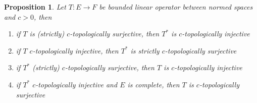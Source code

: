 \documentclass[12pt]{article}
\newtheorem{proposition}[theorem]{Proposition}
\begin{document}
\begin{proposition}\label{PrDualOps} Let $ T:E\to F$ be bounded linear operator
between normed spaces and $c>0$, then
\begin{enumerate}[label = (\roman*)]
    \item if $ T$ is (strictly) $c$-topologically surjective, then $ T^*$ is
    $c$-topologically injective

    \item if $ T$ $c$-topologically injective, then $ T^*$ is strictly
    $c$-topologically surjective

    \item if $ T^*$ (strictly) $c$-topologically surjective, then $ T$ is
    $c$-topologically injective

    \item if $ T^*$ $c$-topologically injective and $E$ is complete, then $ T$ 
    is $c$-topologically surjective
\end{enumerate}
\end{proposition}
\end{document}
